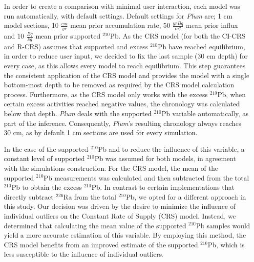 \documentclass [10pt] {article}
\begin{document}
In order to create a comparison with minimal user interaction, each model was run automatically, with default settings.
Default settings for \textit{Plum} are; 1 cm model sections, 10 $\frac{cm}{yr}$ mean prior accumulation rate, 50 $\frac{yr Bq}{m^2}$ mean prior influx and 10 $\frac{Bq}{kg}$ mean prior supported $^{210}$Pb.
As the CRS model (for both the CI-CRS and R-CRS) assumes that supported and excess $^{210}$Pb have reached equilibrium, in order to reduce user input, we decided to fix the last sample (30 cm depth) for every case, as this allows every model to reach equilibrium. This step guarantees the consistent application of the CRS model and provides the model with a single bottom-most depth to be removed as required by the CRS model calculation process. 
Furthermore, as the CRS model only works with the excess $^{210}$Pb, when certain excess activities reached negative values, the chronology was calculated below that depth.
\textit{Plum} deals with the supported $^{210}$Pb variable automatically, as part of the inference.
Consequently, \textit{Plum}'s resulting chronology always reaches 30 cm, as by default 1 cm sections are used for every simulation.

In the case of the supported $^{210}$Pb and to reduce the influence of this variable, %
a constant level of supported $^{210}$Pb was assumed for both models, in agreement with the simulations construction. %
For the CRS model, the mean of the supported $^{210}$Pb measurements was calculated and then subtracted from the total $^{210}$Pb to obtain the excess $^{210}$Pb.
In contrast to certain implementations that directly subtract $^{226}$Ra from the total $^{210}$Pb, we opted for a different approach in this study. Our decision was driven by the desire to minimize the influence of individual outliers on the Constant Rate of Supply (CRS) model. Instead, we determined that calculating the mean value of the supported $^{210}$Pb samples would yield a more accurate estimation of this variable. By employing this method, the CRS model benefits from an improved estimate of the supported $^{210}$Pb, which is less susceptible to the influence of individual outliers.

\end{document}
